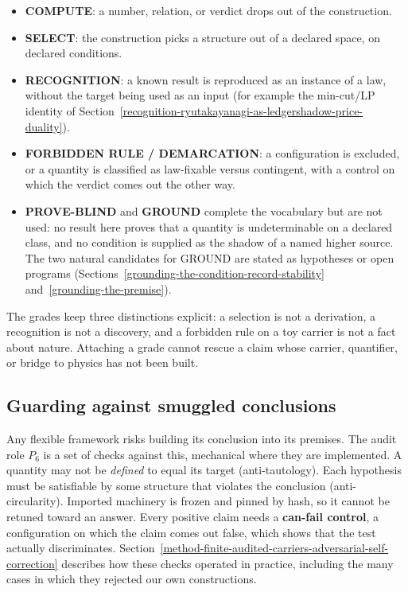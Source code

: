 \begin{itemize}\tightlist
\item \textbf{COMPUTE}: a number, relation, or verdict drops out of the construction.
\item \textbf{SELECT}: the construction picks a structure out of a declared space, on declared conditions.
\item \textbf{RECOGNITION}: a known result is reproduced as an instance of a law, without the target being used as an
  input (for example the min-cut/LP identity of Section~\ref{recognition-ryutakayanagi-as-ledgershadow-price-duality}).
\item \textbf{FORBIDDEN RULE / DEMARCATION}: a configuration is excluded, or a quantity is classified as law-fixable
  versus contingent, with a control on which the verdict comes out the other way.
\item \textbf{PROVE-BLIND} and \textbf{GROUND} complete the vocabulary but are not used: no result here proves that a
  quantity is undeterminable on a declared class, and no condition is supplied as the shadow of a named higher source.
  The two natural candidates for GROUND are stated as hypotheses or open programs
  (Sections~\ref{grounding-the-condition-record-stability} and~\ref{grounding-the-premise}).
\end{itemize}

The grades keep three distinctions explicit: a selection is not a derivation, a recognition is not a discovery, and a
forbidden rule on a toy carrier is not a fact about nature. Attaching a grade cannot rescue a claim whose carrier,
quantifier, or bridge to physics has not been built.

\subsection{Guarding against smuggled conclusions}\label{the-anti-smuggling-discipline}

Any flexible framework risks building its conclusion into its premises. The audit role \(P_6\) is a set of checks
against this, mechanical where they are implemented. A quantity may not be \emph{defined} to equal its target
(anti-tautology). Each hypothesis must be satisfiable by some structure that violates the conclusion
(anti-circularity). Imported machinery is frozen and pinned by hash, so it cannot be retuned toward an answer. Every
positive claim needs a \textbf{can-fail control}, a configuration on which the claim comes out false, which shows that
the test actually discriminates. Section~\ref{method-finite-audited-carriers-adversarial-self-correction} describes how
these checks operated in practice, including the many cases in which they rejected our own constructions.
